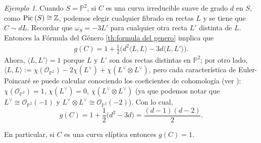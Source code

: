 \documentclass[spanish,12pt]{amsart}
\newcommand{\Pic}[1]{\textup{Pic}{ \: (#1)}}
\theoremstyle{definition}
\theoremstyle{remark}
\newtheorem{example}[theorem]{Ejemplo}
\numberwithin{equation}{section}
\newcommand{\integers}{\mathbb{Z}}
\renewcommand{\O}{\mathcal{O}}
\begin{document}
\begin{example}
Cuando $S = \mathbb{P}^2$, si $C$ es una curva irreducible suave de grado $d$ en $S$, como $\Pic S \cong \integers$, podemos elegir cualquier fibrado en rectas $L$ y se tiene que $C \sim d L$. Recordar que $\omega_S = -3 L'$ para cualquier otra recta $L'$ distinta de $L$. Entonces la Fórmula del Género \ref{th:formula del genero} implica que
\begin{align*}
g(C) = 1 + \frac 1 2 \big ( d^2 \langle L, L \rangle - 3 d \langle L, L' \rangle \big ).
\end{align*}
Ahora, $\langle L, L' \rangle = 1$ porque $L$ y $L'$ son dos rectas distintas en $\mathbb{P}^2$; por otro lado, $\langle L, L \rangle := \chi (\O_{\mathbb{P}^2}) - 2 \chi (L^\vee) + \chi (L^\vee \otimes L^\vee)$, pero cada característica de Euler-Poincaré se puede calcular conociendo los coeficientes de cohomología (ver \cite[Teorema 4.2.1]{notas_pedro}): $\chi (\O_{\mathbb{P}^2}) = 1$, $\chi (L^\vee) = 0$, $\chi (L^\vee \otimes L^\vee)$ (ya que podemos notar que $L^\vee \cong \O_{\mathbb{P}^2} (-1)$ y $L^\vee \otimes L^\vee \cong \O_{\mathbb{P}^2} (-2)$). Con lo cual,
\[
    g(C) = 1 + \frac 1 2 \big ( d^2 - 3d \big) = \frac{(d-1)(d-2)}{2}.
\]

En particular, si $C$ es una curva elíptica entonces $g(C) = 1$.
\end{example}







\end{document}
